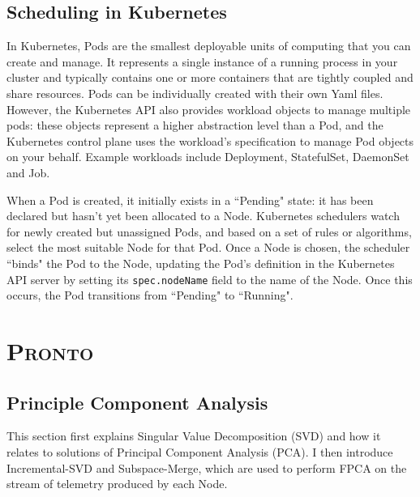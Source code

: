 \subsection{Scheduling in Kubernetes}
In Kubernetes, Pods are the smallest deployable units of computing that you can
create and manage. It represents a single instance of a running
process in your cluster and typically contains one or more containers that are
tightly coupled and share resources. Pods can be individually created with their
own Yaml files. However, the Kubernetes API also provides workload objects to
manage multiple pods: these objects represent a higher abstraction level than a
Pod, and the Kubernetes control plane uses the workload's specification to
manage Pod objects on your behalf. Example workloads include Deployment,
StatefulSet, DaemonSet and Job.

When a Pod is created, it initially exists in a ``Pending" state: it has been
declared but hasn't yet been allocated to a Node. Kubernetes schedulers watch for
newly created but unassigned Pods, and based on a set of
rules or algorithms, select the most suitable Node for that Pod. Once a Node is
chosen, the scheduler ``binds" the Pod to the Node, updating the Pod's definition
in the Kubernetes API server by setting its \verb|spec.nodeName| field to the
name of the Node. Once this occurs, the Pod transitions from ``Pending" to
``Running".

\section{\protect\textsc{Pronto}}

\subsection{Principle Component Analysis}
This section first explains Singular Value Decomposition (SVD) and how it
relates to solutions of Principal Component Analysis (PCA). I then introduce
Incremental-SVD and Subspace-Merge, which are used to perform FPCA on the stream
of telemetry produced by each Node.

